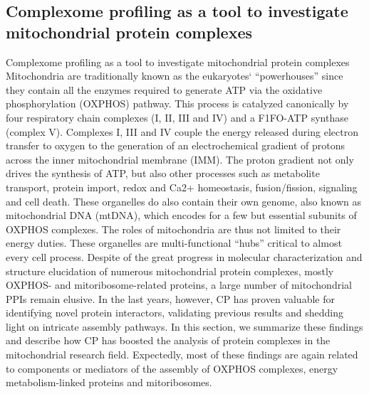 \subsection*{Complexome profiling as a tool to investigate mitochondrial protein complexes} \label{ssec:CP_MS_ssec3}
Complexome profiling as a tool to investigate mitochondrial protein complexes
Mitochondria are traditionally known as the eukaryotes` “powerhouses” since they contain all the enzymes required to generate ATP via the oxidative phosphorylation (OXPHOS) pathway. This process is catalyzed canonically by four respiratory chain complexes (I, II, III and IV) and a F1FO-ATP synthase (complex V). Complexes I, III and IV couple the energy released during electron transfer to oxygen to the generation of an electrochemical gradient of protons across the inner mitochondrial membrane (IMM). The proton gradient not only drives the synthesis of ATP, but also other processes such as metabolite transport, protein import, redox and Ca2+ homeostasis, fusion/fission, signaling and cell death. These organelles do also contain their own genome, also known as mitochondrial DNA (mtDNA), which encodes for a few but essential subunits of OXPHOS complexes. The roles of mitochondria are thus not limited to their energy duties. These organelles are multi-functional “hubs” critical to almost every cell process.
Despite of the great progress in molecular characterization and structure elucidation of numerous mitochondrial protein complexes, mostly OXPHOS- and mitoribosome-related proteins, a large number of mitochondrial PPIs remain elusive. In the last years, however, CP has proven valuable for identifying novel protein interactors, validating previous results and shedding light on intricate assembly pathways. In this section, we summarize these findings and describe how CP has boosted the analysis of protein complexes in the mitochondrial research field. Expectedly, most of these findings are again related to components or mediators of the assembly of OXPHOS complexes, energy metabolism-linked proteins and mitoribosomes.

